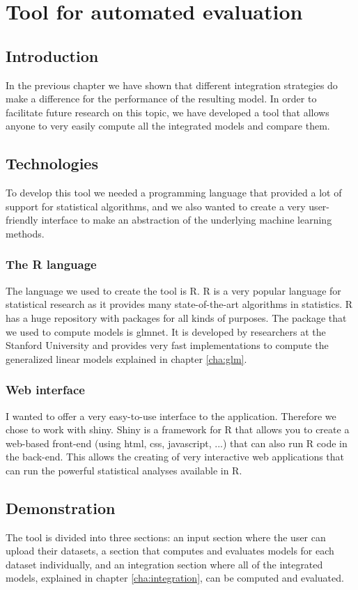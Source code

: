 \chapter{Tool for automated evaluation}
\label{cha:tool}

\section{Introduction}
\label{sec:tool-introduction}
In the previous chapter we have shown that different integration strategies do make a difference for the performance of the resulting model. In order to facilitate future research on this topic, we have developed a tool that allows anyone to very easily compute all the integrated models and compare them.
\section{Technologies}
\label{sec:tool-technologies}
To develop this tool we needed a programming language that provided a lot of support for statistical algorithms, and we also wanted to create a very user-friendly interface to make an abstraction of the underlying machine learning methods.
\subsection{The R language}
The language we used to create the tool is R. R is a very popular language for statistical research as it provides many state-of-the-art algorithms in statistics. R has a huge repository with packages for all kinds of purposes. The package that we used to compute models is glmnet\cite{glmnetvignette}. It is developed by researchers at the Stanford University and provides very fast implementations to compute the generalized linear models explained in chapter \ref{cha:glm}. 
\subsection{Web interface}
I wanted to offer a very easy-to-use interface to the application. Therefore we chose to work with shiny\cite{shiny}. Shiny is a framework for R that allows you to create a web-based front-end (using html, css, javascript, ...) that can also run R code in the back-end. This allows the creating of very interactive web applications that can run the powerful statistical analyses available in R.
\section{Demonstration}
\label{sec:tool-demonstration}
The tool is divided into three sections: an input section where the user can upload their datasets, a section that computes and evaluates models for each dataset individually, and an integration section where all of the integrated models, explained in chapter \ref{cha:integration}, can be computed and evaluated.
